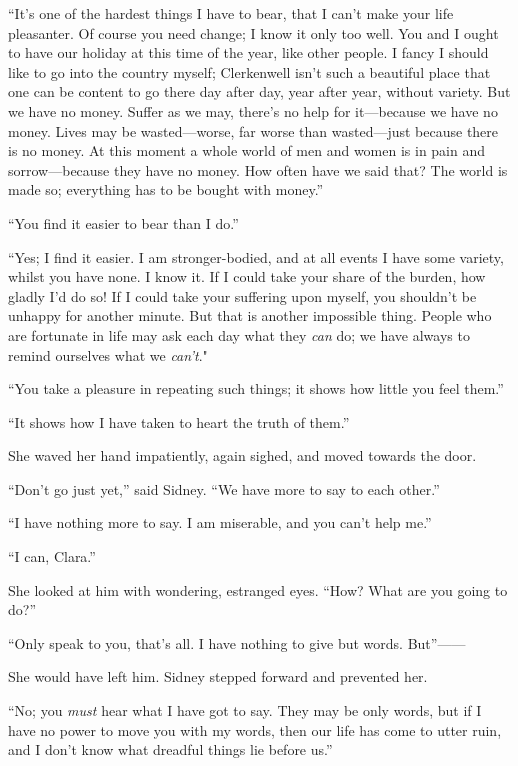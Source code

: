 ``It's one of the hardest things I have to bear, that I can't make your
life pleasanter. Of course you need change; I know it only too well. You
and I ought to have our holiday at this time of the year, like other
people. I fancy I should like to go into the country myself; Clerkenwell
isn't such a beautiful place that one can be content to go there day
after day, year after year, without variety. But we have no money.
Suffer as we may, there's no help for it---because we have no money.
Lives may be wasted---worse, far worse than wasted---just because there
is no money. At this moment a whole world of men and women is in pain
and sorrow---because they have no money. How often have we said that?
The world is made so; everything has to be bought with money.''

{\protect\hypertarget{280}{}{}}``You find it easier to bear than I do.''

``Yes; I find it easier. I am stronger-bodied, and at all events I have
some variety, whilst you have none. I know it. If I could take your
share of the burden, how gladly I'd do so! If I could take your
suffering upon myself, you shouldn't be unhappy for another minute. But
that is another impossible thing. People who are fortunate in life may
ask each day what they \emph{can} do; we have always to remind ourselves
what we \emph{can't}."

``You take a pleasure in repeating such things; it shows how little you
feel them.''

``It shows how I have taken to heart the truth of them.''

She waved her hand impatiently, again sighed, and moved towards the
door.

``Don't go just yet,'' said Sidney. ``We have more to say to each
other.''

``I have nothing more to say. I am miserable, and you can't help me.''

``I can, Clara.''

She looked at him with wondering, estranged eyes. ``How? What are you
going to do?''

``Only speak to you, that's all. I have nothing to give but words.
But''{{------}}

{\protect\hypertarget{281}{}{}}She would have left him. Sidney stepped
forward and prevented her.

``No; you \emph{must} hear what I have got to say. They may be only
words, but if I have no power to move you with my words, then our life
has come to utter ruin, and I don't know what dreadful things lie before
us.''

